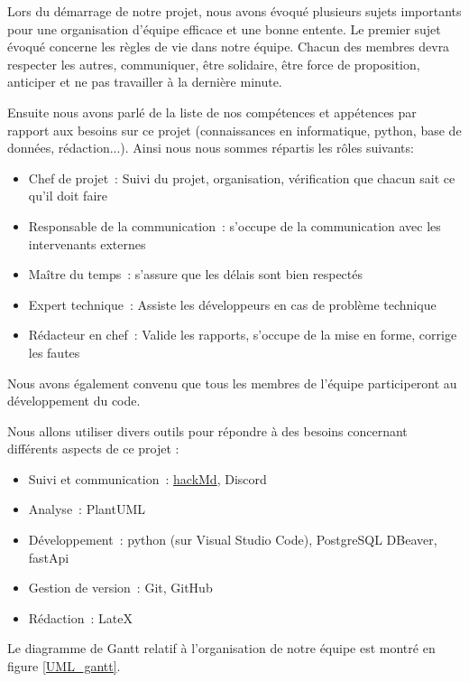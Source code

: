 \documentclass[11pt]{article}
\begin{document}
Lors du démarrage de notre projet, nous avons évoqué plusieurs sujets importants pour une organisation d'équipe efficace et une bonne entente. Le premier sujet évoqué concerne les règles de vie dans notre équipe. Chacun des membres devra respecter les autres, communiquer, être solidaire, être force de proposition, anticiper et ne pas travailler à la dernière minute.


\bigbreak

Ensuite nous avons parlé de la liste de nos compétences et appétences par rapport aux besoins sur ce projet (connaissances en informatique, python, base de données, rédaction...). Ainsi nous nous sommes répartis les rôles suivants:
\begin{itemize}
    \item{Chef de projet~: Suivi du projet, organisation, vérification que chacun sait ce qu’il doit faire}
    \item{Responsable de la communication~: s'occupe de la communication avec les intervenants externes}
    \item{Maître du temps~: s’assure que les délais sont bien respectés}
    \item{Expert technique~: Assiste les développeurs en cas de problème technique}
    \item{Rédacteur en chef~: Valide les rapports, s'occupe de la mise en forme, corrige les fautes}
\end{itemize}

Nous avons également convenu que tous les membres de l'équipe participeront au développement du code.

\bigbreak

Nous allons utiliser divers outils pour répondre à des besoins concernant différents aspects de ce projet :
\begin{itemize}
    \item{Suivi et communication~: \href{https://hackmd.io/CMTCDVW6Spe2PHXOhdKTRQ}{hackMd}, Discord}
    \item{Analyse~: PlantUML}
    \item{Développement~: python (sur Visual Studio Code), PostgreSQL DBeaver, fastApi}
    \item{Gestion de version~: Git, GitHub}
    \item{Rédaction~: LateX}
\end{itemize}


\bigbreak

Le diagramme de Gantt relatif à l'organisation de notre équipe est montré en figure \ref{UML_gantt}.\\
\end{document}
